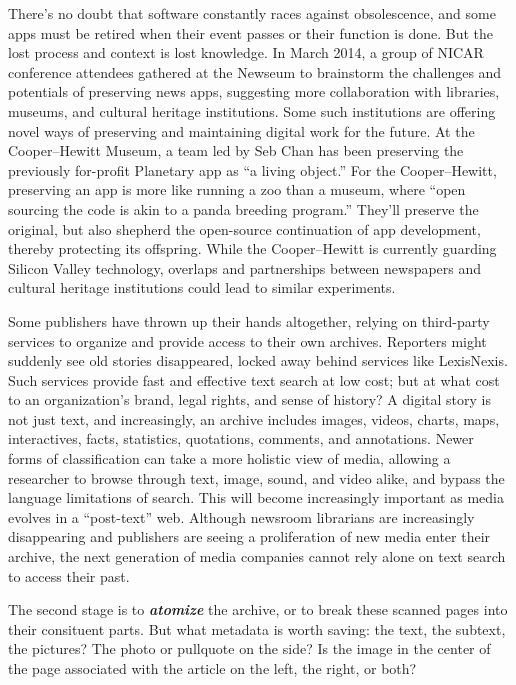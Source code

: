 There's no doubt that software constantly races against obsolescence, and some apps must be retired when their event passes or their function is done. But the lost process and context is lost knowledge. In March 2014, a group of NICAR conference attendees gathered at the Newseum to brainstorm the challenges and potentials of preserving news apps, suggesting more collaboration with libraries, museums, and cultural heritage institutions.\autocite{_opennews/hackdays/archive_????} Some such institutions are offering novel ways of preserving and maintaining digital work for the future. At the Cooper--Hewitt Museum, a team led by Seb Chan has been preserving the previously for-profit Planetary app as ``a living object.'' For the Cooper--Hewitt, preserving an app is more like running a zoo than a museum, where ``open sourcing the code is akin to a panda breeding program.''\autocite{chan_planetary:_2013} They'll preserve the original, but also shepherd the open-source continuation of app development, thereby protecting its offspring. While the Cooper--Hewitt is currently guarding Silicon Valley technology, overlaps and partnerships between newspapers and cultural heritage institutions could lead to similar experiments.

Some publishers have thrown up their hands altogether, relying on third-party services to organize and provide access to their own archives.\autocite{romenesko_u.s._2014} Reporters might suddenly see old stories disappeared, locked away behind services like LexisNexis. Such services provide fast and effective text search at low cost; but at what cost to an organization's brand, legal rights, and sense of history? A digital story is not just text, and increasingly, an archive includes images, videos, charts, maps, interactives, facts, statistics, quotations, comments, and annotations. Newer forms of classification can take a more holistic view of media, allowing a researcher to browse through text, image, sound, and video alike, and bypass the language limitations of search. This will become increasingly important as media evolves in a ``post-text'' web.\autocite{salmon_why_2014} Although newsroom librarians are increasingly disappearing and publishers are seeing a proliferation of new media enter their archive, the next generation of media companies cannot rely alone on text search to access their past.

The second stage is to \textbf{\emph{atomize}} the archive, or to break these scanned pages into their consituent parts. But what metadata is worth saving: the text, the subtext, the pictures? The photo or pullquote on the side? Is the image in the center of the page associated with the article on the left, the right, or both?

